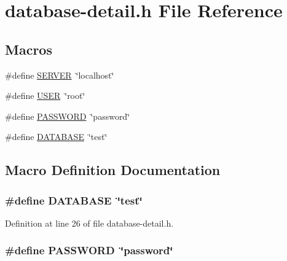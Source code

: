 \hypertarget{database-detail_8h}{\section{database-\/detail.h File Reference}
\label{database-detail_8h}
}
\subsection*{Macros}
\begin{DoxyCompactItemize}
\item 
\#define \hyperlink{database-detail_8h_a24cd3c37a165a8c4626d9e78df4574ff}{S\-E\-R\-V\-E\-R}~\char`\"{}localhost\char`\"{}
\item 
\#define \hyperlink{database-detail_8h_a8bfbbf31b7d3c07215440d18a064b7f4}{U\-S\-E\-R}~\char`\"{}root\char`\"{}
\item 
\#define \hyperlink{database-detail_8h_a9e8538fad4eee548302ad9f60e6d47ca}{P\-A\-S\-S\-W\-O\-R\-D}~\char`\"{}password\char`\"{}
\item 
\#define \hyperlink{database-detail_8h_a39dc88d73783e112dbfcf98adbdbefa6}{D\-A\-T\-A\-B\-A\-S\-E}~\char`\"{}test\char`\"{}
\end{DoxyCompactItemize}


\subsection{Macro Definition Documentation}
\hypertarget{database-detail_8h_a39dc88d73783e112dbfcf98adbdbefa6}{
\subsubsection[{D\-A\-T\-A\-B\-A\-S\-E}]{\setlength{\rightskip}{0pt plus 5cm}\#define D\-A\-T\-A\-B\-A\-S\-E~\char`\"{}test\char`\"{}}}\label{database-detail_8h_a39dc88d73783e112dbfcf98adbdbefa6}


Definition at line 26 of file database-\/detail.\-h.

\hypertarget{database-detail_8h_a9e8538fad4eee548302ad9f60e6d47ca}{
\subsubsection[{P\-A\-S\-S\-W\-O\-R\-D}]{\setlength{\rightskip}{0pt plus 5cm}\#define P\-A\-S\-S\-W\-O\-R\-D~\char`\"{}password\char`\"{}}}\label{database-detail_8h_a9e8538fad4eee548302ad9f60e6d47ca}


